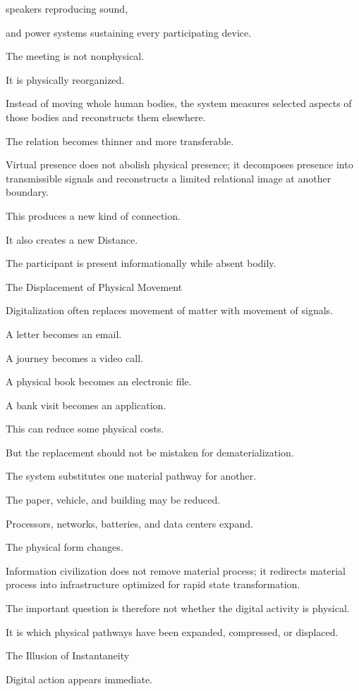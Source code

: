 speakers reproducing sound,

and power systems sustaining every participating device.

The meeting is not nonphysical.

It is physically reorganized.

Instead of moving whole human bodies, the system measures selected aspects of those bodies and reconstructs them elsewhere.

The relation becomes thinner and more transferable.

Virtual presence does not abolish physical presence; it decomposes presence into transmissible signals and reconstructs a limited relational image at another boundary.

This produces a new kind of connection.

It also creates a new Distance.

The participant is present informationally while absent bodily.

The Displacement of Physical Movement

Digitalization often replaces movement of matter with movement of signals.

A letter becomes an email.

A journey becomes a video call.

A physical book becomes an electronic file.

A bank visit becomes an application.

This can reduce some physical costs.

But the replacement should not be mistaken for dematerialization.

The system substitutes one material pathway for another.

The paper, vehicle, and building may be reduced.

Processors, networks, batteries, and data centers expand.

The physical form changes.

Information civilization does not remove material process; it redirects material process into infrastructure optimized for rapid state transformation.

The important question is therefore not whether the digital activity is physical.

It is which physical pathways have been expanded, compressed, or displaced.

The Illusion of Instantaneity

Digital action appears immediate.


